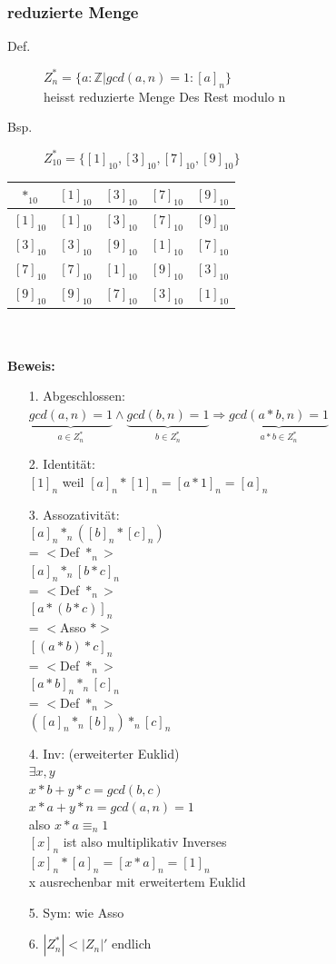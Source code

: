 \documentclass[a4paper,10pt]{article}
\newcommand{\ZN}{\mathbb{Z}} %
\newcommand{\Bold}[1]{\textbf{#1}} %
\newcommand{\Ra}{\Rightarrow}
\begin{document}
\subsubsection{reduzierte Menge}
\begin{description}
	\item[Def.] $Z_n^*=\{a:\ZN | gcd(a,n) =1:[a]_n \}$ \\
		heisst reduzierte Menge Des Rest modulo n
	\item[Bsp.] $Z_{10}^*=\{[1]_{10},[3]_{10}, [7]_{10}, [9]_{10} \}$
\end{description}
\begin{tabular}{c | c | c | c | c }
	$*_{10}$ & $[1]_{10}$ & $[3]_{10}$ & $[7]_{10}$ & $[9]_{10}$ \\
	\hline
	$[1]_{10}$ & $[1]_{10}$ & $[3]_{10}$ & $[7]_{10}$ & $[9]_{10}$ \\
	\hline
	$[3]_{10}$ & $[3]_{10}$ & $[9]_{10}$ & $[1]_{10}$ & $[7]_{10}$ \\
	\hline
	$[7]_{10}$ & $[7]_{10}$ & $[1]_{10}$ & $[9]_{10}$ & $[3]_{10}$ \\
	\hline
	$[9]_{10}$ & $[9]_{10}$ & $[7]_{10}$ & $[3]_{10}$ & $[1]_{10}$
\end{tabular} \\ \\
\Bold {Beweis:}
\begin{itemize}
	\item[1.] Abgeschlossen: \\
		$\underbrace{gcd(a,n)=1}_{a \in Z_n^*} \wedge \underbrace{gcd(b,n)=1}_{b \in Z_n^*} \Ra \underbrace{gcd(a*b,n)=1}_{a*b \in Z_n^*}$
	\item[2.] Identit\"at: \\
		$[1]_n$ weil $[a]_n * [1]_n = [a*1]_n =[a]_n$
	\item[3.] Assozativit\"at: \\
		$[a]_n *_n ([b]_n * [c]_n)$ \\
		= $<$Def $*_n>$ \\
		$[a]_n *_n [b*c]_n$ \\
		= $<$Def $*_n>$ \\
		$[a * (b*c)]_n$ \\
		= $<$Asso $*>$ \\
		$[(a*b)*c]_n$ \\
		= $<$Def $*_n>$ \\
		$[a * b]_n *_n [c]_n$ \\
		= $<$Def $*_n>$ \\
		$([a]_n *_n [b]_n) *_n [c]_n$
	\item[4.] Inv: (erweiterter Euklid) \\
		$\exists x,y$ \\
		$x*b+y*c=gcd(b,c)$ \\
		$x*a+y*n=gcd(a,n)=1$ \\
		also $x*a {\equiv}_n 1$ \\
		$[x]_n$ ist also multiplikativ Inverses \\
		$[x]_n*[a]_n=[x*a]_n=[1]_n$ \\
		x ausrechenbar mit erweitertem Euklid
	\item[5.] Sym: wie Asso
	\item[6.] $|Z_n^*|<|Z_n|'$ endlich
\end{itemize}
\end{document}
